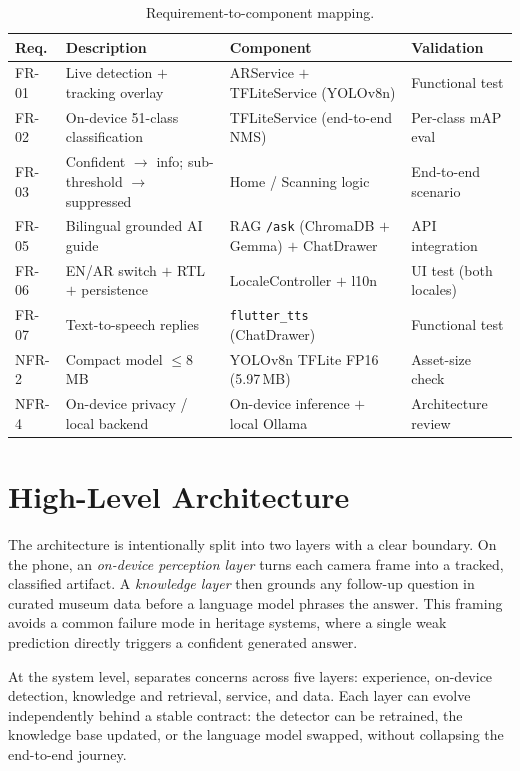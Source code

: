 \begin{table}[htbp]
\centering\small
\caption{Requirement-to-component mapping.}
\label{tab:traceability}
\begin{tabularx}{\textwidth}{@{}l>{\raggedright\arraybackslash}X>{\raggedright\arraybackslash}X>{\raggedright\arraybackslash}p{2.3cm}@{}}
\toprule
\textbf{Req.} & \textbf{Description} & \textbf{Component} & \textbf{Validation}\\
\midrule
FR-01 & Live detection $+$ tracking overlay & ARService $+$ TFLiteService (YOLOv8n) & Functional test\\
FR-02 & On-device 51-class classification & TFLiteService (end-to-end NMS) & Per-class mAP eval\\
FR-03 & Confident $\rightarrow$ info; sub-threshold $\rightarrow$ suppressed & Home / Scanning logic & End-to-end scenario\\
FR-05 & Bilingual grounded AI guide & RAG \texttt{/ask} (ChromaDB $+$ Gemma) $+$ ChatDrawer & API integration\\
FR-06 & EN/AR switch $+$ RTL $+$ persistence & LocaleController $+$ l10n & UI test (both locales)\\
FR-07 & Text-to-speech replies & \texttt{flutter\_tts} (ChatDrawer) & Functional test\\
NFR-2 & Compact model $\leq 8$\,MB & YOLOv8n TFLite FP16 (5.97\,MB) & Asset-size check\\
NFR-4 & On-device privacy / local backend & On-device inference $+$ local Ollama & Architecture review\\
\bottomrule
\end{tabularx}
\end{table}

\FloatBarrier
\section{High-Level Architecture}

The architecture is intentionally split into two layers with a clear boundary. On the
phone, an \emph{on-device perception layer} turns each camera frame into a tracked,
classified artifact. A \emph{knowledge layer} then grounds any follow-up question in
curated museum data before a language model phrases the answer. This framing avoids a
common failure mode in heritage systems, where a single weak prediction directly
triggers a confident generated answer.

At the system level, \TimeLens{} separates concerns across five layers: experience,
on-device detection, knowledge and retrieval, service, and data. Each layer can evolve
independently behind a stable contract: the detector can be retrained, the knowledge
base updated, or the language model swapped, without collapsing the end-to-end journey.

